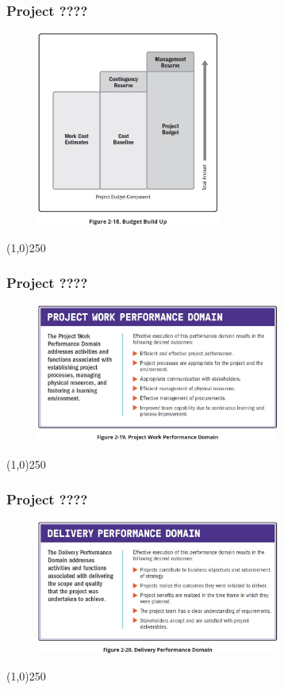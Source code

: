 \begin{frame}
\frametitle{Project ????}
 \begin{figure}
    \centering
        \includegraphics[width = 6cm]{../images/guide/Fig2-18.jpg}
    \label{guidefig:2-18}
 \end{figure}
\end{frame}
\begin{center}\line(1,0){250}\end{center}

\begin{frame}
\frametitle{Project ????}
 \begin{figure}
    \centering
        \includegraphics[width = 8cm]{../images/guide/Fig2-19.jpg}
    \label{guidefig:2-19}
 \end{figure}
\end{frame}
\begin{center}\line(1,0){250}\end{center}

\begin{frame}
\frametitle{Project ????}
 \begin{figure}
    \centering
        \includegraphics[width = 8cm]{../images/guide/Fig2-20.jpg}
    \label{guidefig:2-20}
 \end{figure}
\end{frame}
\begin{center}\line(1,0){250}\end{center}

